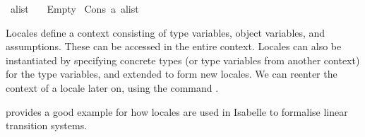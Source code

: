 \begin{isabellebody}
\begin{isamarkuptext}
\end{isamarkuptext}\isamarkuptrue%
\isamarkupfalse%
\ {\isacharparenleft}{\kern0pt}{\isacharprime}{\kern0pt}a{\isacharparenright}{\kern0pt}list\ {\isacharequal}{\kern0pt}\isanewline
\ \ Empty\isanewline
{\isacharbar}{\kern0pt}\ Cons\ {\isacartoucheopen}{\isacharprime}{\kern0pt}a{\isacartoucheclose}\ {\isacartoucheopen}{\isacharparenleft}{\kern0pt}{\isacharprime}{\kern0pt}a{\isacharparenright}{\kern0pt}list{\isacartoucheclose}%
\isadelimdocument
%
\endisadelimdocument
%
\isatagdocument
%
\isamarkuptrue%
%
\endisatagdocument
{\isafolddocument}%
%
\isadelimdocument
%
\endisadelimdocument
%
\begin{isamarkuptext}%
Locales define a context consisting of type variables, object variables, and assumptions. These can be accessed in the entire context. Locales can also be instantiated by specifying concrete types (or type variables from another context) for the type variables, and extended to form new locales. We can reenter the context of a locale later on, using the command .

 provides a good example for how locales are used in Isabelle to formalise linear transition systems.%
\end{isamarkuptext}\isamarkuptrue%
%
\isadelimtheory
%
\endisadelimtheory
%
\isatagtheory
%
\endisatagtheory
{\isafoldtheory}%
%
\isadelimtheory
%
\endisadelimtheory
%
\end{isabellebody}%
\endinput
